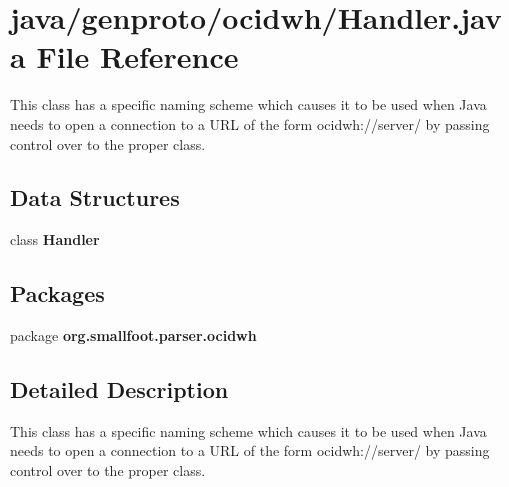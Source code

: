 \section{java/genproto/ocidwh/\+Handler.java File Reference}
\label{ocidwh_2Handler_8java}


This class has a specific naming scheme which causes it to be used when Java needs to open a connection to a U\+R\+L of the form ocidwh\+://server/ by passing control over to the proper class.  


\subsection*{Data Structures}
\begin{DoxyCompactItemize}
\item 
class {\bf Handler}
\end{DoxyCompactItemize}
\subsection*{Packages}
\begin{DoxyCompactItemize}
\item 
package {\bf org.\+smallfoot.\+parser.\+ocidwh}
\end{DoxyCompactItemize}


\subsection{Detailed Description}
This class has a specific naming scheme which causes it to be used when Java needs to open a connection to a U\+R\+L of the form ocidwh\+://server/ by passing control over to the proper class. 

